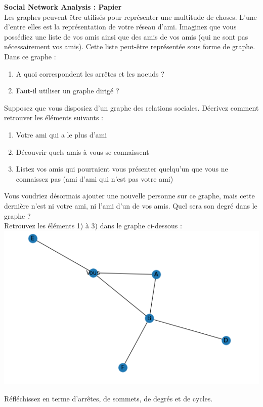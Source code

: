 \begin{Exercice}[10 minutes] \textbf{Social Network Analysis : Papier}\\
    Les graphes peuvent être utilisés pour représenter une multitude de choses.  L'une d'entre elles est la représentation de votre réseau d'ami. Imaginez que vous possédiez une liste de vos amis ainsi que des amis de vos amis (qui ne sont pas nécessairement vos amis). Cette liste peut-être représentée sous forme de graphe. Dans ce graphe :\\
    \begin{enumerate}
        \item  A quoi correspondent les arrêtes et les noeuds ? 
        \item Faut-il utiliser un graphe dirigé ?
    \end{enumerate}
    Supposez que vous disposiez d'un graphe des relations sociales. Décrivez comment retrouver les éléments suivants :
    \begin{enumerate}
        \item Votre ami qui a le plus d'ami
        \item Découvrir quels amis à vous se connaissent
        \item Listez vos amis qui pourraient vous présenter quelqu'un que vous ne connaissez pas (ami d'ami qui n'est pas votre ami)
    \end{enumerate}
    Vous voudriez désormais ajouter une nouvelle personne sur ce graphe, mais cette dernière n'est ni votre ami, ni l'ami d'un de vos amis. Quel sera son degré dans le graphe ?\\
    
    Retrouvez les éléments 1) à 3) dans le graphe ci-dessous :\\
    \includegraphics[]{Network1.PNG}
    \begin{conseil}
        Réfléchissez en terme d'arrêtes, de sommets, de degrés et de cycles.
    \end{conseil}


\end{Exercice}
